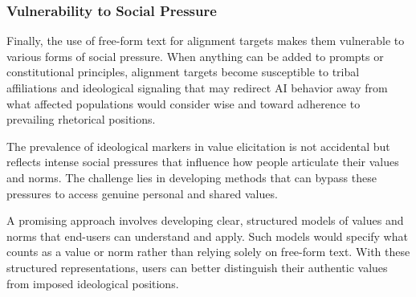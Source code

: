 \subsubsection{Vulnerability to Social Pressure}

Finally, the use of free-form text for alignment targets makes them vulnerable to various forms of social pressure. When anything can be added to prompts or constitutional principles, alignment targets become susceptible to tribal affiliations and ideological signaling that may redirect AI behavior away from what affected populations would consider wise and toward adherence to prevailing rhetorical positions.

The prevalence of ideological markers in value elicitation is not accidental but reflects intense social pressures that influence how people articulate their values and norms. The challenge lies in developing methods that can bypass these pressures to access genuine personal and shared values.

A promising approach involves developing clear, structured models of values and norms that end-users can understand and apply. Such models would specify what counts as a value or norm rather than relying solely on free-form text. With these structured representations, users can better distinguish their authentic values from imposed ideological positions.